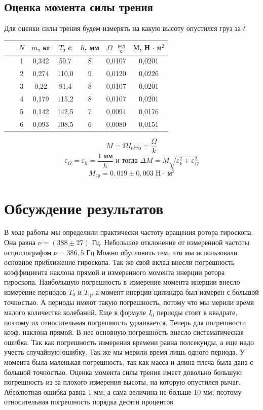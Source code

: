 \documentclass[a4paper,12pt]{article}
\begin{document}
\subsection*{Оценка момента силы трения}

Для оценки силы трения будем измерять на какую высоту опустился груз за $t$

\begin{table}[!ht]
    \centering
    \begin{tabular}{|c|c|c|c|c|c|c|}
    \hline
        ~ & $N$ & $m$, кг & $T$, c & $h$, мм & $\Omega \text{ } \frac{рад}{с}$ & $М$, Н $\cdot \text{ м}^2$  \\ \hline
        ~ & 1 & 0,342 & 59,7 & 8 & 0,0107 & 0,0201  \\ \hline
        ~ & 2 & 0,274 & 110,0 & 9 & 0,0120 & 0,0226  \\ \hline
        ~ & 3 & 0,22 & 91,4 & 8 & 0,0107 & 0,0201  \\ \hline
        ~ & 4 & 0,179 & 115,2 & 8 & 0,0107 & 0,0201  \\ \hline
        ~ & 5 & 0,142 & 142,5 & 7 & 0,0094 & 0,0176  \\ \hline
        ~ & 6 & 0,093 & 108,5 & 6 & 0,0080 & 0,0151 \\ \hline
    \end{tabular}
\end{table}
$$M = \Omega I_0\omega_0 = \frac{\Omega}{k}$$
$$\varepsilon_\Omega = \varepsilon_h = \frac{1 \text{ мм}}{h} \text{ и тогда } \Delta M = M\sqrt{\varepsilon_k^2+\varepsilon_\Omega^2}$$
$$M_\text{ср} = 0,019 \pm 0,003 \text{ Н} \cdot \text{ м}^2$$


\section{Обсуждение результатов} 
В ходе работы мы определили практически частоту вращения ротора гироскопа. Она равна $ \nu = \left( 388 \pm 27 \right) \text{ Гц}$. Небольшое отклонение от измеренной частоты осциллографом $\nu = 386,5 \text{ Гц}$
Можно обусловить тем, что мы использовали основное приближение гироскопа. Так же свой вклад внесли погрешность коэффициента наклона прямой и измеренного момента инерции ротора гироскопа. 
Наибольшую погрешность в измерение момента инерции внесло измерение периодов $T_0$ и $T_ц$, а момент инерции цилиндра был измерен с большой точностью. А периоды имеют такую погрешность, потому что мы мерили время малого количества колебаний. Еще в формуле $I_0$ периоды стоят в квадрате, поэтому их относительная погрешность удваивается.
Теперь для погрешности коэф. наклона прямой. В нее основную погрешность внесло систематическая ошибка. Так как погрешность измерения времени равна полсекунды, а еще надо учесть случайную ошибку. Так же мы мерили время лишь одного периода. У момента была маленькая погрешность, так как масса и длина плеча была дана с большой точностью.
Оценка момента силы трения имеет довольно большую погрешность из за плохого измерения высоты, на которую опустился рычаг. Абсолютная ошибка равна 1 мм, а сама величина не больше 10 мм, поэтому относительная погрешность порядка десяти процентов.  
\end{document}
